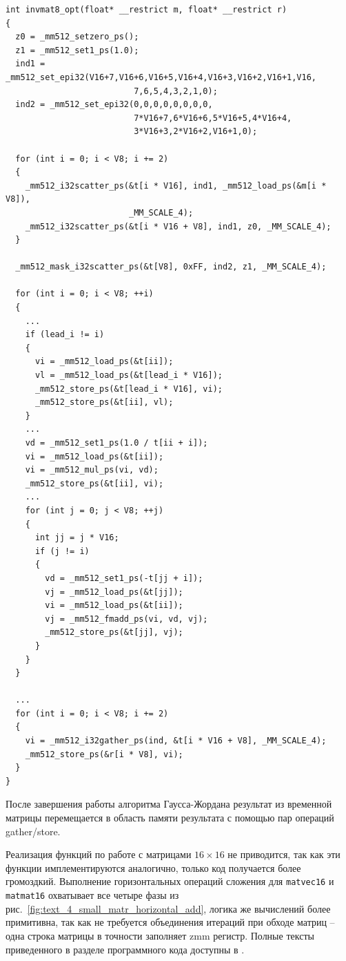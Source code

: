 \begin{singlespace}
\begin{lstlisting}[caption={Векторизованная версия вычисления обратной \\ матрицы размера $8 \times 8$.},label={lst:text_4_small_matr_invmat_opt}]
int invmat8_opt(float* __restrict m, float* __restrict r)
{
  z0 = _mm512_setzero_ps();
  z1 = _mm512_set1_ps(1.0);
  ind1 = _mm512_set_epi32(V16+7,V16+6,V16+5,V16+4,V16+3,V16+2,V16+1,V16,
                          7,6,5,4,3,2,1,0);
  ind2 = _mm512_set_epi32(0,0,0,0,0,0,0,0,
                          7*V16+7,6*V16+6,5*V16+5,4*V16+4,
                          3*V16+3,2*V16+2,V16+1,0);

  for (int i = 0; i < V8; i += 2)
  {
    _mm512_i32scatter_ps(&t[i * V16], ind1, _mm512_load_ps(&m[i * V8]),
                         _MM_SCALE_4);
    _mm512_i32scatter_ps(&t[i * V16 + V8], ind1, z0, _MM_SCALE_4);
  }

  _mm512_mask_i32scatter_ps(&t[V8], 0xFF, ind2, z1, _MM_SCALE_4);

  for (int i = 0; i < V8; ++i)
  {
    ...
    if (lead_i != i)
    {
      vi = _mm512_load_ps(&t[ii]);
      vl = _mm512_load_ps(&t[lead_i * V16]);
      _mm512_store_ps(&t[lead_i * V16], vi);
      _mm512_store_ps(&t[ii], vl);
    }
    ...
    vd = _mm512_set1_ps(1.0 / t[ii + i]);
    vi = _mm512_load_ps(&t[ii]);
    vi = _mm512_mul_ps(vi, vd);
    _mm512_store_ps(&t[ii], vi);
    ...
    for (int j = 0; j < V8; ++j)
    {
      int jj = j * V16;
      if (j != i)
      {
        vd = _mm512_set1_ps(-t[jj + i]);
        vj = _mm512_load_ps(&t[jj]);
        vi = _mm512_load_ps(&t[ii]);
        vj = _mm512_fmadd_ps(vi, vd, vj);
        _mm512_store_ps(&t[jj], vj);
      }
    }
  }

  ...
  for (int i = 0; i < V8; i += 2)
  {
    vi = _mm512_i32gather_ps(ind, &t[i * V16 + V8], _MM_SCALE_4);
    _mm512_store_ps(&r[i * V8], vi);
  }
}
\end{lstlisting}
\end{singlespace}

После завершения работы алгоритма Гаусса-Жордана результат из временной матрицы перемещается в область памяти результата с помощью пар операций gather/store.

Реализация функций по работе с матрицами $16 \times 16$ не приводится, так как эти функции имплементируются аналогично, только код получается более громоздкий.
Выполнение горизонтальных операций сложения для \texttt{matvec16} и \texttt{matmat16} охватывает все четыре фазы из рис.~\ref{fig:text_4_small_matr_horizontal_add}, логика же вычислений более примитивна, так как не требуется объединения итераций при обходе матриц -- одна строка матрицы в точности заполняет zmm регистр.
Полные тексты приведенного в разделе программного кода доступны в \cite{iparGithub}.


